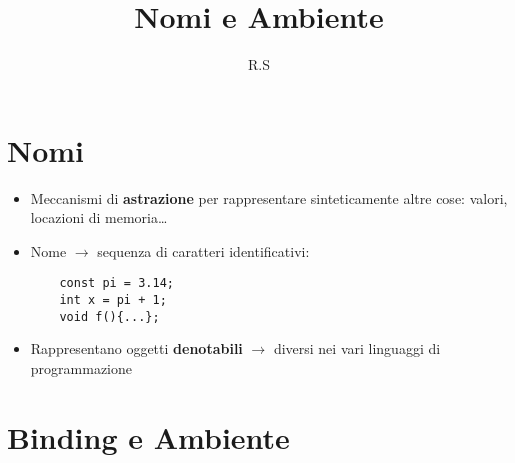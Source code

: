 \documentclass{article}
\title{Nomi e Ambiente}
\author{R.S}
\begin{document}
\maketitle

\section*{Nomi}

\begin{itemize}
  \item Meccanismi di \textbf{astrazione} per rappresentare sinteticamente altre cose: valori, locazioni di memoria\dots
  \item Nome $\rightarrow$ sequenza di caratteri identificativi:
  \begin{lstlisting}
    const pi = 3.14;
    int x = pi + 1;
    void f(){...};
  \end{lstlisting}
  \item Rappresentano oggetti \textbf{denotabili} $\rightarrow$ diversi nei vari linguaggi di programmazione
\end{itemize}

\section*{Binding e Ambiente}
\end{document}
